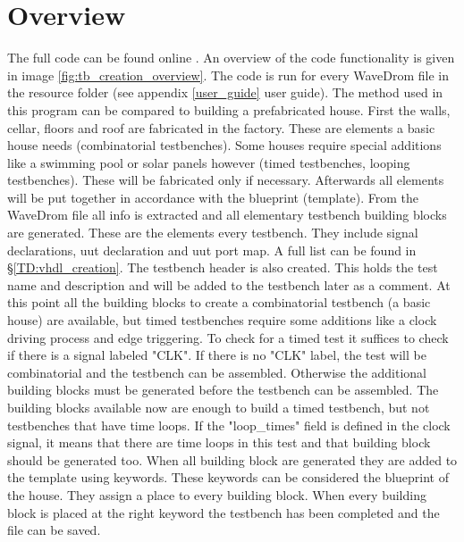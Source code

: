 \section{Overview}
The full code can be found online \cite{github}. An overview of the code functionality is given in image \ref{fig:tb_creation_overview}.
\nline
The code is run for every WaveDrom file in the resource folder (see appendix \ref{user_guide} user guide). The method used in this program can be compared to building a prefabricated house. First the walls, cellar, floors and roof are fabricated in the factory. These are elements a basic house needs (combinatorial testbenches). Some houses require special additions like a swimming pool or solar panels however (timed testbenches, looping testbenches). These will be fabricated only if necessary. Afterwards all elements will be put together in accordance with the blueprint (template).
\npar
From the WaveDrom file all info is extracted and all elementary testbench building blocks are generated. These are the elements every testbench. They include signal declarations, uut declaration and uut port map. A full list can be found in §\ref{TD:vhdl_creation}. The testbench header is also created. This holds the test name and description and will be added to the testbench later as a comment.
\npar
At this point all the building blocks to create a combinatorial testbench (a basic house) are available, but timed testbenches require some additions like a clock driving process and edge triggering. To check for a timed test it suffices to check if there is a signal labeled "CLK". If there is no "CLK" label, the test will be combinatorial and the testbench can be assembled. Otherwise the additional building blocks must be generated before the testbench can be assembled. 
\npar
The building blocks available now are enough to build a timed testbench, but not testbenches that have time loops. If the "loop\_times" field is defined in the clock signal, it means that there are time loops in this test and that building block should be generated too.
\npar
When all building block are generated they are added to the template using keywords. These keywords can be considered the blueprint of the house. They assign a place to every building block. When every building block is placed at the right keyword the testbench has been completed and the file can be saved.
